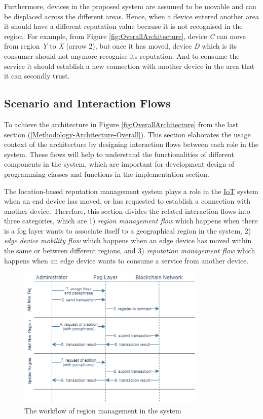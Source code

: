 \npara Furthermore, devices in the proposed system are assumed to be movable and can be displaced across the different areas.
Hence, when a device entered another area it should have a different reputation value because it is not recognised in the region.
For example, from Figure \ref{fig:OverallArchitecture}, device \textit{C} can move from region \textit{Y} to \textit{X} (arrow 2), but once it has moved, device \textit{D} which is its consumer should not anymore recognise its reputation.
And to consume the service it should establish a new connection with another device in the area that it can secondly trust.

\subsection{Scenario and Interaction Flows} \label{Methodology-Architecture-Flows}

\npara To achieve the architecture in Figure \ref{fig:OverallArchitecture} from the last section (\ref{Methodology-Architecture-Overall}).
This section elaborates the usage context of the architecture by designing interaction flows between each role in the system.
These flows will help to understand the functionalities of different components in the system, which are important for development design of programming classes and functions in the implementation section.

\npara The location-based reputation management system plays a role in the \hyperref[Acronym-IoT]{IoT} system when an end device has moved, or has requested to establish a connection with another device.
Therefore, this section divides the related interaction flows into three categories, which are 1) \textit{region management flow} which happens when there is a fog layer wants to associate itself to a geographical region in the system, 2) \textit{edge device mobility flow} which happens when an edge device has moved within the same or between different regions, and 3) \textit{reputation management flow} which happens when an edge device wants to consume a service from another device.

\begin{figure}[htb!]
  \centering
  \includegraphics[width=0.8\textwidth]{images/WorkflowManageRegion.png}
  \caption{The workflow of region management in the system}
  \label{fig:WorkflowManageRegion}
\end{figure}

